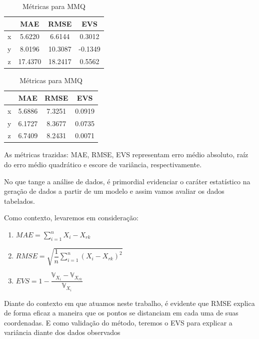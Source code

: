 \documentclass[12pt, a4paper]{article}
\begin{document}
\begin{table}[htbp]
    \centering
    \begin{minipage}{0.45\textwidth}
        \centering
        \caption{Métricas \textit{splines} cúbicas}
        \begin{tabular}{|c|c|c|c|}
            \hline
              & MAE    & RMSE   & EVS     \\
            \hline
            x & 5.6220 & 6.6144 & 0.3012  \\ \hline
            y & 8.0196 & 10.3087 & -0.1349  \\ \hline
            z & 17.4370 & 18.2417 & 0.5562 \\ \hline
        \end{tabular}
    \end{minipage}%
    \hfill
    \begin{minipage}{0.45\textwidth}
        \centering
        \caption{Métricas para MMQ}
        \begin{tabular}{|c|c|c|c|}
            \hline
              & MAE    & RMSE   & EVS    \\
            \hline
            x & 5.6886 & 7.3251 & 0.0919 \\ \hline
            y & 6.1727 & 8.3677 & 0.0735 \\ \hline
            z & 6.7409 & 8.2431 & 0.0071 \\ \hline
        \end{tabular}
    \end{minipage}
\end{table}

As métricas trazidas: MAE, RMSE, EVS representam erro médio absoluto, raíz do erro médio quadrático e escore de variância, respectivamente. 

No que tange a análise de dados, é primordial evidenciar o caráter estatístico na geração de dados a partir de um modelo e assim vamos avaliar os dados tabelados.

Como contexto, levaremos em consideração: 

\begin{enumerate}
    \item $MAE = \sum_{i=1}^n X_i - X_{rk}$
    \item $RMSE = \sqrt{\dfrac{1}{n} \sum_{i=1}^n (X_i - X_{rk})^2}$
    \item $EVS = 1 - \dfrac{\mathbb{V}_{X_i} - \mathbb{V}_{X_{rk}}}{\mathbb{V}_{X_i}}$
\end{enumerate}

Diante do contexto em que atuamos neste trabalho, é evidente que RMSE explica de forma eficaz a maneira que os pontos se distanciam em cada uma de suas coordenadas. E como validação do método, teremos o EVS para explicar a variância diante dos dados observados
\end{document}
